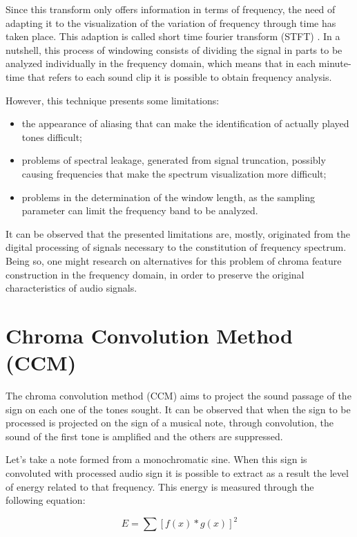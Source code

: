 \documentclass{article}
\begin{document}
	Since this transform only offers information in terms of frequency, the need of adapting it to the visualization of the variation of frequency through time has taken place. This adaption is called short time fourier transform (STFT) \cite{cohen1995time}. In a nutshell, this process of windowing consists of dividing the signal in parts to be analyzed individually in the frequency domain, which means that in each minute-time that refers to each sound clip it is possible to obtain frequency analysis.

	However, this technique presents some limitations:
	\begin{itemize}
		\item the appearance of aliasing that can make the identification of actually played tones difficult;
		\item problems of spectral leakage, generated from signal truncation, possibly causing frequencies that make the spectrum visualization more difficult;
		\item problems in the determination of the window length, as the sampling parameter can limit the frequency band to be analyzed.
	\end{itemize}

	It can be observed that the presented limitations are, mostly, originated from the digital processing of signals necessary to the constitution of frequency spectrum. Being so, one might research on alternatives for this problem of chroma feature construction in the frequency domain, in order to preserve the original characteristics of audio signals.

\section{Chroma Convolution Method (CCM)}\label{sec:ccm}

	The chroma convolution method (CCM) aims to project the sound passage of the sign on each one of the tones sought. It can be observed that when the sign to be processed is projected on the sign of a musical note, through convolution, the sound of the first tone is amplified and the others are suppressed. 

	Let's take a note formed from a monochromatic sine. When this sign is convoluted with processed audio sign it is possible to extract as a result the level of energy related to that frequency.  This energy is measured through the following  equation:

	\begin{equation}\label{ccm_equation}
		E = \sum [f(x)*g(x)]^{2}
	\end{equation}
\end{document}
